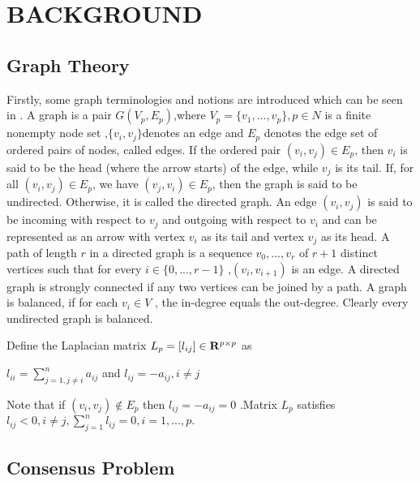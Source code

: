 \documentclass[english]{cccconf}
\begin{document}
\section{BACKGROUND}

\subsection{Graph Theory }

Firstly, some graph terminologies and notions are introduced which can be seen in \cite{Mesbahi2010}.
A graph is a pair $G({V_p},{E_p})$,where ${V_p} = \{ {v_1},...,{v_p}\} ,p \in N$ is a finite nonempty node set ,$\{ {v_i},{v_j}\} $denotes an edge and $E_p$ denotes the edge  set of ordered pairs of nodes, called edges. If the ordered pair $({v_i},{v_j}) \in {E_p}$, then $v_i$ is said to be the head (where the arrow starts) of the edge, while $v_j$ is its tail. If, for all $({v_i},{v_j}) \in {E_p}$, we have $({v_j},{v_i}) \in {E_p}$, then the graph is said to be undirected. Otherwise, it is called the directed graph. An edge $({v_i},{v_j})$ is said to be incoming with respect to $v_j$  and outgoing with respect to $v_i$  and can be represented as an arrow with vertex $v_i$  as its tail and vertex $v_j$  as its head. A path of length $r$ in a directed graph is a sequence  ${v_0},...,{v_r}$ of $r+1$ distinct vertices such that for every $i \in \{ 0,...,r - 1\} $ ,$({v_i},{v_{i + 1}})$  is an edge. A directed graph is strongly connected if any two vertices can be joined by a path. A graph is balanced, if for each ${v_i} \in V$ , the in-degree equals the out-degree. Clearly every undirected graph is balanced.

Define the Laplacian matrix  ${L_p} = [{l_{ij}}] \in {{\bf{R}}^{p \times p}}$  as

${l_{ii}} = \sum\limits_{j = 1,j \ne i}^n {{a_{ij}}} $ and ${l_{ij}} =  - {a_{ij}},i \ne j$


Note that if $({v_i},{v_j}) \notin {E_p}$ then ${l_{ij}} =  - {a_{ij}} = 0$ .Matrix $L_p$  satisfies
${l_{ij}} < 0,i \ne j,\sum\limits_{j = 1}^n {{l_{ij}}}  = 0,i = 1,...,p.$

\subsection{Consensus Problem }
\end{document}

